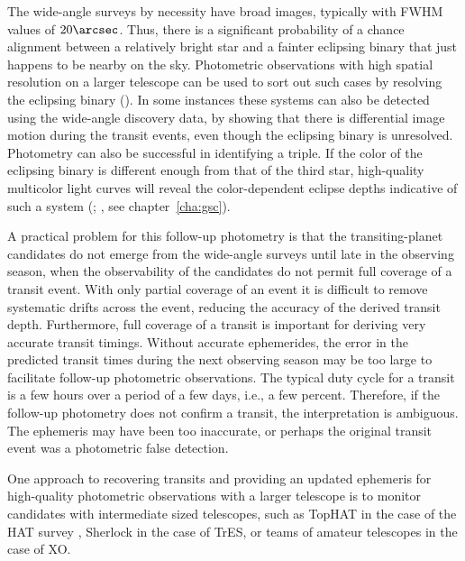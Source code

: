 The wide-angle surveys by necessity have broad images, typically with FWHM values of $20\arcsec$. Thus, there is a significant probability of a chance alignment between a relatively bright star and a fainter eclipsing binary that just happens to be nearby on the sky. Photometric observations with high spatial resolution on a larger telescope can be used to sort out such cases by resolving the eclipsing binary (\citealp[see, e.g.,][]{Charbonneau_Brown_Dunham:AIP:2004a}). In some instances these systems can also be detected using the wide-angle discovery data, by showing that there is differential image motion during the transit events, even though the eclipsing binary is unresolved. Photometry can also be successful in identifying a triple. If the color of the eclipsing binary is different enough from that of the third star, high-quality multicolor light curves will reveal the color-dependent eclipse depths indicative of such a system (\citealp[see, e.g.,][]{Tingley:aa:2004a}; \citealp{ODonovan_Charbonneau_Torres:apj:2006a}, see chapter~\ref{cha:gsc}).

A practical problem for this follow-up photometry is that the transiting-planet candidates do not emerge from the wide-angle surveys until late in the observing season, when the observability of the candidates do not permit full coverage of a transit event. With only partial coverage of an event it is difficult to remove systematic drifts across the event, reducing the accuracy of the derived transit depth. Furthermore, full coverage of a transit is important for deriving very accurate transit timings. Without accurate ephemerides, the error in the predicted transit times during the next observing season may be too large to facilitate follow-up photometric observations. The typical duty cycle for a transit is a few hours over a period of a few days, i.e., a few percent. Therefore, if the follow-up photometry does not confirm a transit, the interpretation is ambiguous. The ephemeris may have been too inaccurate, or perhaps the original transit event was a photometric false detection.

One approach to recovering transits and providing an updated ephemeris for high-quality photometric observations with a larger telescope is to monitor candidates with intermediate sized telescopes, such as TopHAT in the case of the HAT survey \citep{Bakos_Noyes_Kovacs:pasp:2004a}, Sherlock \citep{Kotredes_Charbonneau_Looper:2004a} in the case of TrES, or teams of amateur telescopes \citep{McCullough_Stys_Valenti:apj:2006a} in the case of XO.

